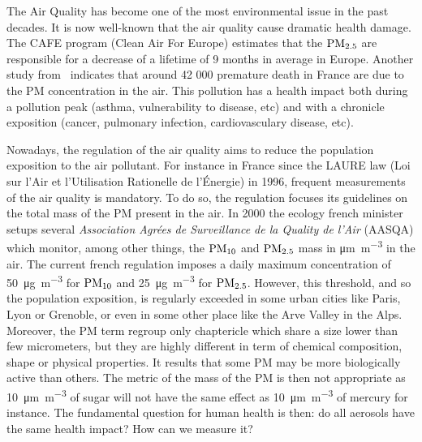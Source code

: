 The Air Quality has become one of the most environmental issue in the past decades. It is
now well-known that the air quality cause dramatic health damage. The CAFE program (Clean
Air For Europe) estimates that the $\text{PM}_{2.5}$ are responsible for a decrease of a
lifetime of 9 months in average in Europe. Another study
from~\textcite{amannBaseline2005}
indicates that around 42 000 premature death in France are due to the PM concentration in
the air.  This pollution has a health impact both during a pollution peak (asthma,
vulnerability to disease, etc) and with a chronicle exposition (cancer, pulmonary
infection, cardiovasculary disease, etc).

Nowadays, the regulation of the air quality aims to reduce the population exposition to
the air pollutant. For instance in France since the LAURE law (Loi sur l'Air et
l'Utilisation Rationelle de l'Énergie) in 1996, frequent measurements of the air quality
is mandatory.  To do so, the regulation focuses its guidelines on the total mass of the PM
present in the air.  In 2000 the ecology french minister setups several \emph{Association
Agrées de Surveillance de la Quality de l'Air} (AASQA) which monitor, among other things,
the $\text{PM}_{10}$ and $\text{PM}_{2.5}$ mass in \si{\um\per\cubic\m} in the air.  The current
french regulation imposes a daily maximum concentration of \SI{50}{\ug\per\cubic\m} for
$\text{PM}_{10}$ and \SI{25}{\ug\per\cubic\m} for $\text{PM}_{2.5}$. However, this threshold, and so
the population exposition, is regularly exceeded in some urban cities like Paris, Lyon or
Grenoble, or even in some other place like the Arve Valley in the Alps.
Moreover, the PM term regroup only chaptericle which share a size lower than few micrometers,
but they are highly different in term of chemical composition, shape or physical
properties. It results that some PM may be more biologically active than others.  The
metric of the mass of the PM is then not appropriate as \SI{10}{\um\per\cubic\m} of sugar
will not have the same effect as \SI{10}{\um\per\cubic\m} of mercury for instance.  The
fundamental question for human health is then: do all aerosols have the same health
impact? How can we measure it? 

